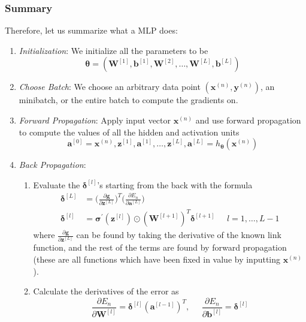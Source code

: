 \documentclass{article}
\theoremstyle{definition}
\theoremstyle{remark}
\theoremstyle{definition}
\begin{document}
    \subsubsection{Summary}

    Therefore, let us summarize what a MLP does: 
    \begin{enumerate}
        \item \textit{Initialization}: We initialize all the parameters to be 
        \[\boldsymbol{\theta} = (\mathbf{W}^{[1]}, \mathbf{b}^{[1]}, \mathbf{W}^{[2]}, \ldots, \mathbf{W}^{[L]}, \mathbf{b}^{[L]})\]
        
        \item \textit{Choose Batch}: We choose an arbitrary data point $(\mathbf{x}^{(n)}, \mathbf{y}^{(n)})$, an minibatch, or the entire batch to compute the gradients on. 
        
        \item \textit{Forward Propagation}: Apply input vector $\mathbf{x}^{(n)}$ and use forward propagation to compute the values of all the hidden and activation units 
        \[\mathbf{a}^{[0]} = \mathbf{x}^{(n)}, \mathbf{z}^{[1]}, \mathbf{a}^{[1]}, \ldots, \mathbf{z}^{[L]}, \mathbf{a}^{[L]} = h_{\boldsymbol{\theta}} (\mathbf{x}^{(n)})\]
        
        \item \textit{Back Propagation}: 
        \begin{enumerate}
            \item Evaluate the $\boldsymbol{\delta}^{[l]}$'s starting from the back with the formula 
            \begin{align*}
                \boldsymbol{\delta}^{[L]} & = \bigg( \frac{\partial \mathbf{g}}{\partial \mathbf{z}^{[L]}} \bigg)^T \bigg( \frac{\partial E_n}{\partial \mathbf{a}^{[L]}} \bigg) \\
                \boldsymbol{\delta}^{[l]} & = \boldsymbol{\sigma}^\prime (\mathbf{z}^{[l]}) \odot (\mathbf{W}^{[l+1]})^T \boldsymbol{\delta}^{[l+1]} \;\;\;\;\; l = 1, \ldots, L-1
            \end{align*}
            where $\frac{\partial \mathbf{g}}{\partial \mathbf{z}^{[L]}}$ can be found by taking the derivative of the known link function, and the rest of the terms are found by forward propagation (these are all functions which have been fixed in value by inputting $\mathbf{x}^{(n)}$).  

            \item Calculate the derivatives of the error as 
            \[\frac{\partial E_n}{\partial \mathbf{W}^{[l]}} = \boldsymbol{\delta}^{[l]} (\mathbf{a}^{[l-1]})^T, \;\;\;\;\; \frac{\partial E_n}{\partial \mathbf{b}^{[l]}} = \boldsymbol{\delta}^{[l]}\]
        \end{enumerate}
        

\end{enumerate}
\end{document}
